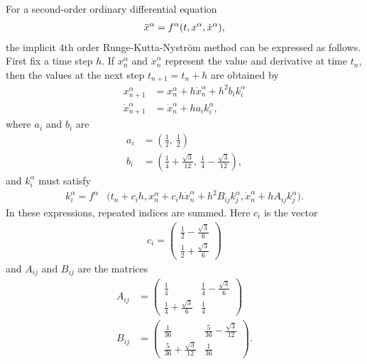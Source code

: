 \documentclass[amsmath,amssymb,nofootinbib,notitlepage,superscriptaddress,twocolumn]{revtex4-2}
\begin{document}
For a second-order ordinary differential equation
\begin{align}
\Ddot{x}^{\alpha}=f^{\alpha}(t,x^{\alpha},\Dot{x}^{\alpha}),
\end{align}
the implicit 4th order Runge-Kutta-Nystr\"om method can be expressed as follows.  First fix a time step $h$.  If $x_n^{\alpha}$ and $\Dot{x}_n^{\alpha}$ represent the value and derivative at time $t_n$, then the values at the next step $t_{n+1}=t_n+h$ are obtained by
\begin{align}
x_{n+1}^{\alpha}&=x_{n}^{\alpha}+h\Dot{x}_n^{\alpha}+h^2 b_i k^{\alpha}_i\\
    \Dot{x}_{n+1}^{\alpha}&=\Dot{x}_n^{\alpha}+h a_i k^{\alpha}_i,
\end{align}
where $a_i$ and $b_i$ are
\begin{align}
    a_i&=\left(\frac{1}{2},\ \frac{1}{2}\right)\\
    b_i&=\left(\frac{1}{4}+\frac{\sqrt{3}}{12},\ \frac{1}{4}-\frac{\sqrt{3}}{12}\right),
\end{align}
and $k^{\alpha}_i$ must satisfy
\begin{align}\label{k}
    k^{\alpha}_i=f^{\alpha}&\big(t_n+c_i h, x^{\alpha}_n+c_i h \Dot{x}_n^{\alpha}+h^2B_{ij}k^{\alpha}_j, 
    \Dot{x}_n^{\alpha}+hA_{ij}k^{\alpha}_j \big).
\end{align}
In these expressions, repeated indices are summed. Here $c_i$ is the vector
\begin{align}
    c_i=\begin{pmatrix} \frac{1}{2}-\frac{\sqrt{3}}{6} \\ \frac{1}{2}+\frac{\sqrt{3}}{6}\end{pmatrix}
\end{align}
and $A_{ij}$ and $B_{ij}$ are the matrices
\begin{align}
    A_{ij}& =\begin{pmatrix}
    \frac{1}{4} & \frac{1}{4}-\frac{\sqrt{3}}{6}\\
    \frac{1}{4}+\frac{\sqrt{3}}{6} & \frac{1}{4}
    \end{pmatrix}
     \\
    B_{ij}& =\begin{pmatrix}
    \frac{1}{36} & \frac{5}{36}-\frac{\sqrt{3}}{12}\\
    \frac{5}{36}+\frac{\sqrt{3}}{12} & \frac{1}{36}
    \end{pmatrix}.
\end{align}
\end{document}
